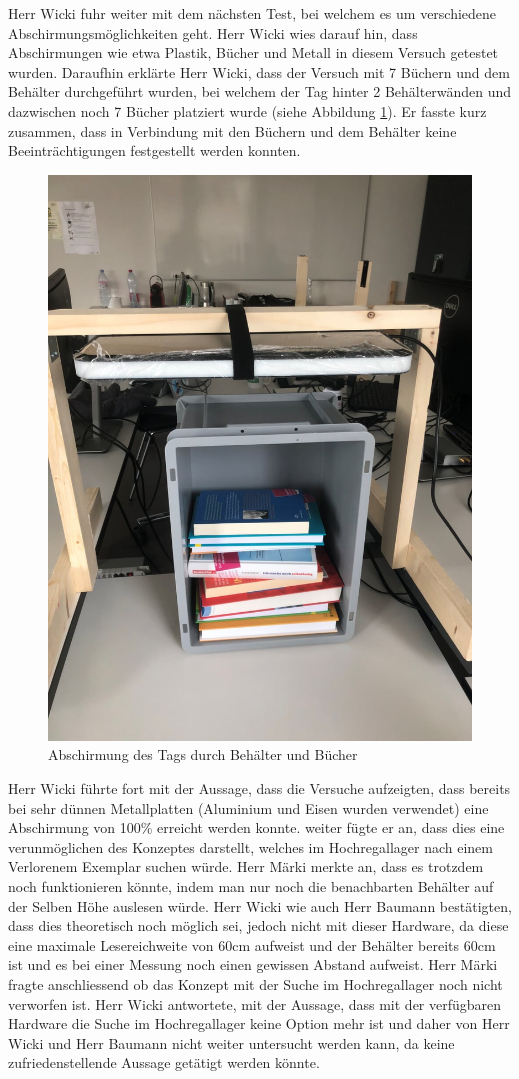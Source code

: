 \documentclass[parskip=full, a4paper]{scrreprt}
\begin{document}
Herr Wicki fuhr weiter mit dem nächsten Test, bei welchem es um verschiedene Abschirmungsmöglichkeiten geht. Herr Wicki wies darauf hin, dass Abschirmungen wie etwa Plastik, Bücher und Metall in diesem Versuch getestet wurden. Daraufhin erklärte Herr Wicki, dass der Versuch mit 7 Büchern und dem Behälter durchgeführt wurden, bei welchem der Tag hinter 2 Behälterwänden und dazwischen noch 7 Bücher platziert wurde (siehe Abbildung \ref{fig:bucherMitBehälterAlsAbschirmung}). Er fasste kurz zusammen, dass in Verbindung mit den Büchern und dem Behälter keine Beeinträchtigungen festgestellt werden konnten.
\begin{figure}[htb]
	\centering
	\includegraphics[keepaspectratio,width=.6\linewidth]{img/AbschirmungDurchBehaelter}
	\caption{Abschirmung des Tags durch Behälter und Bücher}
	\label{fig:bucherMitBehälterAlsAbschirmung}
\end{figure}
Herr Wicki führte fort mit der Aussage, dass die Versuche aufzeigten, dass bereits bei sehr dünnen Metallplatten (Aluminium und Eisen wurden verwendet) eine Abschirmung von 100\% erreicht werden konnte. weiter fügte er an, dass dies eine verunmöglichen des Konzeptes darstellt, welches im Hochregallager nach einem Verlorenem Exemplar suchen würde.
Herr Märki merkte an, dass es trotzdem noch funktionieren könnte, indem man nur noch die benachbarten Behälter auf der Selben Höhe auslesen würde. Herr Wicki wie auch Herr Baumann bestätigten, dass dies theoretisch noch möglich sei, jedoch nicht mit dieser Hardware, da diese eine maximale Lesereichweite von 60cm aufweist und der Behälter bereits 60cm ist und es bei einer Messung noch einen gewissen Abstand aufweist. Herr Märki fragte anschliessend ob das Konzept mit der Suche im Hochregallager noch nicht verworfen ist. Herr Wicki antwortete, mit der Aussage, dass mit der verfügbaren Hardware die Suche im Hochregallager keine Option mehr ist und daher von Herr Wicki und Herr Baumann nicht weiter untersucht werden kann, da keine zufriedenstellende Aussage getätigt werden könnte.
\end{document}
